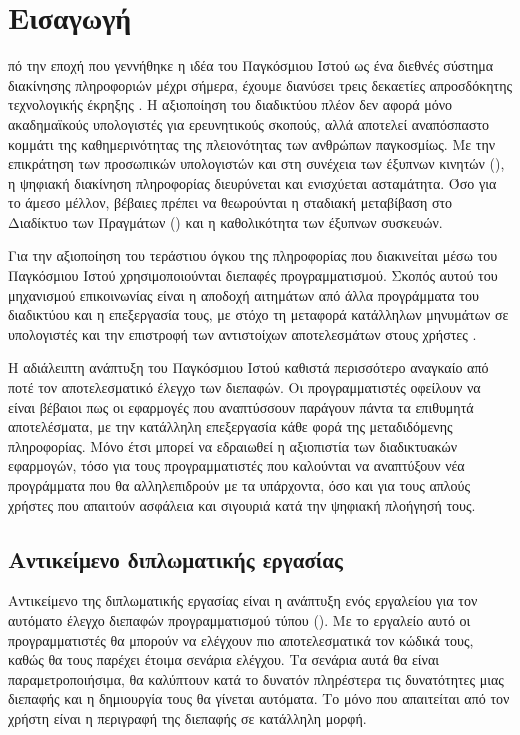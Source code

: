 \chapter{Εισαγωγή} 
πό την εποχή που γεννήθηκε η ιδέα του Παγκόσμιου Ιστού ως ένα διεθνές σύστημα διακίνησης πληροφοριών μέχρι σήμερα,
έχουμε διανύσει τρεις δεκαετίες απροσδόκητης τεχνολογικής έκρηξης \cite{Web89}.
Η αξιοποίηση του διαδικτύου πλέον δεν αφορά μόνο ακαδημαϊκούς υπολογιστές για ερευνητικούς σκοπούς,
αλλά αποτελεί αναπόσπαστο κομμάτι της καθημερινότητας της πλειονότητας των ανθρώπων παγκοσμίως.
Με την επικράτηση των προσωπικών υπολογιστών και στη συνέχεια των έξυπνων κινητών (),
η ψηφιακή διακίνηση πληροφορίας διευρύνεται και ενισχύεται ασταμάτητα.
Όσο για το άμεσο μέλλον, βέβαιες πρέπει να θεωρούνται η σταδιακή μεταβίβαση στο Διαδίκτυο των Πραγμάτων () και η καθολικότητα των έξυπνων συσκευών.

Για την αξιοποίηση του τεράστιου όγκου της πληροφορίας που διακινείται μέσω του Παγκόσμιου Ιστού χρησιμοποιούνται διεπαφές προγραμματισμού.
Σκοπός αυτού του μηχανισμού επικοινωνίας είναι η αποδοχή αιτημάτων από άλλα προγράμματα του διαδικτύου και η επεξεργασία τους,
με στόχο τη μεταφορά κατάλληλων μηνυμάτων σε υπολογιστές και την επιστροφή των αντιστοίχων αποτελεσμάτων στους χρήστες \cite{date_relational_1975}.

Η αδιάλειπτη ανάπτυξη του Παγκόσμιου Ιστού καθιστά περισσότερο αναγκαίο από ποτέ τον αποτελεσματικό έλεγχο των διεπαφών.
Οι προγραμματιστές οφείλουν να είναι βέβαιοι πως οι εφαρμογές που αναπτύσσουν παράγουν πάντα τα επιθυμητά αποτελέσματα, 
με την κατάλληλη επεξεργασία κάθε φορά της μεταδιδόμενης πληροφορίας.
Μόνο έτσι μπορεί να εδραιωθεί η αξιοπιστία των διαδικτυακών εφαρμογών,
τόσο για τους προγραμματιστές που καλούνται να αναπτύξουν νέα προγράμματα που θα αλληλεπιδρούν με τα υπάρχοντα,
όσο και για τους απλούς χρήστες που απαιτούν ασφάλεια και σιγουριά κατά την ψηφιακή πλοήγησή τους.

\section{Αντικείμενο διπλωματικής εργασίας}
Αντικείμενο της διπλωματικής εργασίας είναι η ανάπτυξη ενός εργαλείου για τον αυτόματο έλεγχο διεπαφών προγραμματισμού τύπου  ().
Με το εργαλείο αυτό οι προγραμματιστές θα μπορούν να ελέγχουν πιο αποτελεσματικά τον κώδικά τους, καθώς θα τους παρέχει έτοιμα σενάρια ελέγχου.
Τα σενάρια αυτά θα είναι παραμετροποιήσιμα, θα καλύπτουν κατά το δυνατόν πληρέστερα τις δυνατότητες μιας διεπαφής και η δημιουργία τους θα γίνεται αυτόματα.
Το μόνο που απαιτείται από τον χρήστη είναι η περιγραφή της διεπαφής σε κατάλληλη μορφή.

